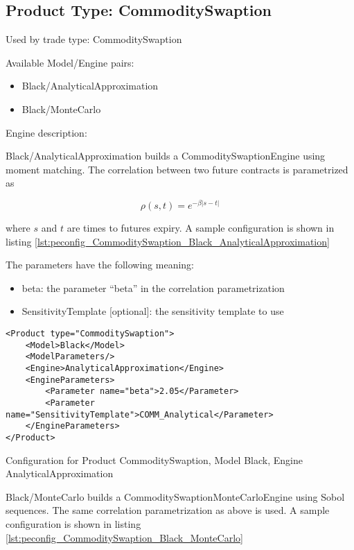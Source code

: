 \subsection{Product Type: CommoditySwaption}

Used by trade type: CommoditySwaption

Available Model/Engine pairs:

\begin{itemize}
\item Black/AnalyticalApproximation
\item Black/MonteCarlo
\end{itemize}

Engine description:

Black/AnalyticalApproximation builds a CommoditySwaptionEngine using moment matching. The correlation between two future
contracts is parametrized as

$$\rho(s, t) = e^{-\beta |s-t|}$$

where $s$ and $t$ are times to futures expiry. A sample configuration is shown in listing
\ref{lst:peconfig_CommoditySwaption_Black_AnalyticalApproximation}

The parameters have the following meaning:

\begin{itemize}
\item beta: the parameter ``beta'' in the correlation parametrization
\item SensitivityTemplate [optional]: the sensitivity template to use 
\end{itemize}

\begin{longlisting}
\begin{verbatim}
<Product type="CommoditySwaption">
    <Model>Black</Model>
    <ModelParameters/>
    <Engine>AnalyticalApproximation</Engine>
    <EngineParameters>
        <Parameter name="beta">2.05</Parameter>
        <Parameter name="SensitivityTemplate">COMM_Analytical</Parameter>
    </EngineParameters>
</Product>
\end{verbatim}
\caption{Configuration for Product CommoditySwaption, Model Black, Engine AnalyticalApproximation}
\label{lst:peconfig_CommoditySwaption_Black_AnalyticalApproximation}
\end{longlisting}

Black/MonteCarlo builds a CommoditySwaptionMonteCarloEngine using Sobol sequences. The same correlation parametrization
as above is used. A sample configuration is shown in listing
\ref{lst:peconfig_CommoditySwaption_Black_MonteCarlo}

